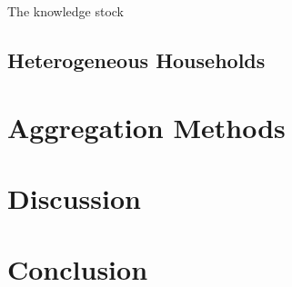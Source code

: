 The knowledge stock 

\subsection{Heterogeneous Households}

\section{Aggregation Methods}

\section{Discussion}

\section{Conclusion}
